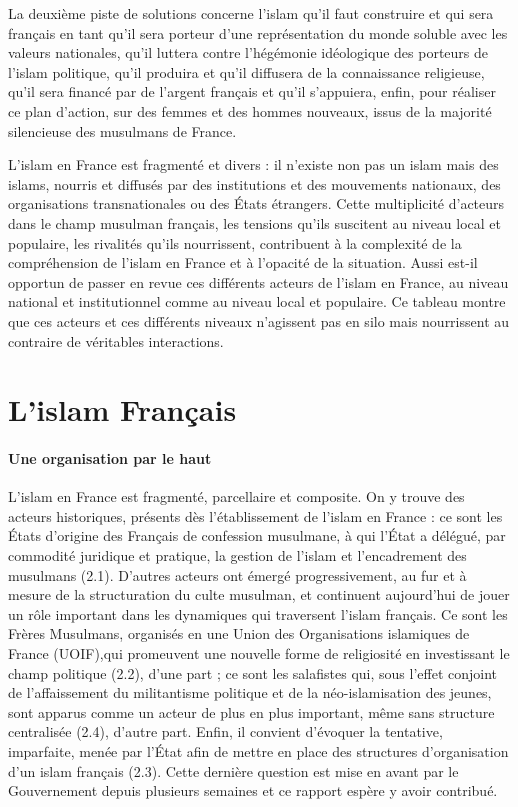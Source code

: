 La deuxième piste de solutions concerne l'islam qu'il faut construire et
qui sera français en tant qu'il sera porteur d'une représentation du
monde soluble avec les valeurs nationales, qu'il luttera contre
l'hégémonie idéologique des porteurs de l'islam politique, qu'il
produira et qu'il diffusera de la connaissance religieuse, qu'il sera
financé par de l'argent français et qu'il s'appuiera, enfin, pour
réaliser ce plan d'action, sur des femmes et des hommes nouveaux, issus
de la majorité silencieuse des musulmans de France.

L'islam en France est fragmenté et divers : il n'existe non pas un islam
mais des islams, nourris et diffusés par des institutions et des
mouvements nationaux, des organisations transnationales ou des États
étrangers. Cette multiplicité d'acteurs dans le champ musulman français,
les tensions qu'ils suscitent au niveau local et populaire, les
rivalités qu'ils nourrissent, contribuent à la complexité de la
compréhension de l'islam en France et à l'opacité de la situation. Aussi
est-il opportun de passer en revue ces différents acteurs de l'islam en
France, au niveau national et institutionnel comme au niveau local et
populaire. Ce tableau montre que ces acteurs et ces différents niveaux
n'agissent pas en silo mais nourrissent au contraire de véritables
interactions.

 
\section{L'islam Français} 


\paragraph{Une organisation par le haut}

L'islam en France est fragmenté, parcellaire et composite. On y trouve
des acteurs historiques, présents dès l'établissement de l'islam en
France : ce sont les États d'origine des Français de confession
musulmane, à qui l'État a délégué, par commodité juridique et pratique,
la gestion de l'islam et l'encadrement des musulmans (2.1). D'autres
acteurs ont émergé progressivement, au fur et à mesure de la
structuration du culte musulman, et continuent aujourd'hui de jouer un
rôle important dans les dynamiques qui traversent l'islam français. Ce
sont les Frères Musulmans, organisés en une Union des Organisations
islamiques de France (UOIF),qui promeuvent une nouvelle forme de
religiosité en investissant le champ politique (2.2), d'une part ; ce
sont les salafistes qui, sous l'effet conjoint de l'affaissement du
militantisme politique et de la néo-islamisation des jeunes, sont
apparus comme un acteur de plus en plus important, même sans structure
centralisée (2.4), d'autre part. Enfin, il convient d'évoquer la
tentative, imparfaite, menée par l'État afin de mettre en place des
structures d'organisation d'un islam français (2.3). Cette dernière
question est mise en avant par le Gouvernement depuis plusieurs semaines
et ce rapport espère y avoir contribué.



